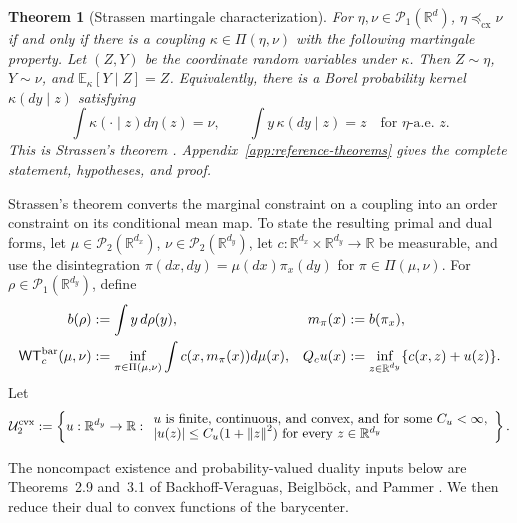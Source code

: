 \documentclass[11pt]{article}
\newcommand{\R}{\mathbb R}
\newcommand{\E}{\mathbb E}
\newcommand{\cP}{\mathcal P}
\newcommand{\norm}[1]{\left\lVert #1\right\rVert}
\newcommand{\cx}{\preceq_{\mathrm{cx}}}
\theoremstyle{plain}
\newtheorem{theorem}{Theorem}[section]
\theoremstyle{definition}
\theoremstyle{remark}
\begin{document}
\begin{theorem}[Strassen martingale characterization]\label{thm:strassen}
For $\eta,\nu\in\cP_1(\R^d)$, $\eta\cx\nu$ if and only if there is a coupling
$\kappa\in\Pi(\eta,\nu)$ with the following martingale property. Let $(Z,Y)$ be
the coordinate random variables under $\kappa$. Then $Z\sim\eta$, $Y\sim\nu$, and
$\E_\kappa[Y\mid Z]=Z$. Equivalently, there is a
Borel probability kernel $\kappa(dy\mid z)$ satisfying
\[
  \int\kappa(\mathord\cdot\mid z)d\eta(z)=\nu,
  \qquad \int y\,\kappa(dy\mid z)=z\quad\text{for $\eta$-a.e. }z.
\]
This is Strassen's theorem \cite{Strassen}.
Appendix~\ref{app:reference-theorems} gives the complete statement, hypotheses,
and proof.
\end{theorem}

Strassen's theorem converts the marginal constraint on a coupling into an order
constraint on its conditional mean map. To state the resulting primal and dual
forms, let $\mu\in\cP_2(\R^{d_x})$, $\nu\in\cP_2(\R^{d_y})$, let
$c:\R^{d_x}\times\R^{d_y}\to\R$ be measurable, and use the disintegration
$\pi(dx,dy)=\mu(dx)\pi_x(dy)$ for $\pi\in\Pi(\mu,\nu)$. For
$\rho\in\cP_1(\R^{d_y})$, define
\begin{equation}\label{eq:barycentric-wot-notation}
\begin{aligned}
 b(\rho)&:=\int y\,d\rho(y),
 &m_\pi(x)&:=b(\pi_x),\\
 \mathsf{WT}_{c}^{\rm bar}(\mu,\nu)
 &:=\inf_{\pi\in\Pi(\mu,\nu)}\int c(x,m_\pi(x))d\mu(x),
 &Q_cu(x)&:=\inf_{z\in\R^{d_y}}\{c(x,z)+u(z)\}.
\end{aligned}
\end{equation}
Let
\begin{equation}\label{eq:quadratic-convex-potentials}
 \mathcal U_2^{\rm cvx}:=
 \left\{u:\R^{d_y}\to\R:
 \begin{array}{l}
 u\text{ is finite, continuous, and convex, and for some }C_u<\infty,\\[-2pt]
 |u(z)|\le C_u(1+\norm z^2)\text{ for every }z\in\R^{d_y}
 \end{array}\right\}.
\end{equation}

The noncompact existence and probability-valued duality inputs below are
Theorems~2.9 and~3.1 of Backhoff-Veraguas, Beiglb\"ock, and Pammer
\cite{BBP}. We then reduce their dual to convex functions of the barycenter.
\end{document}
